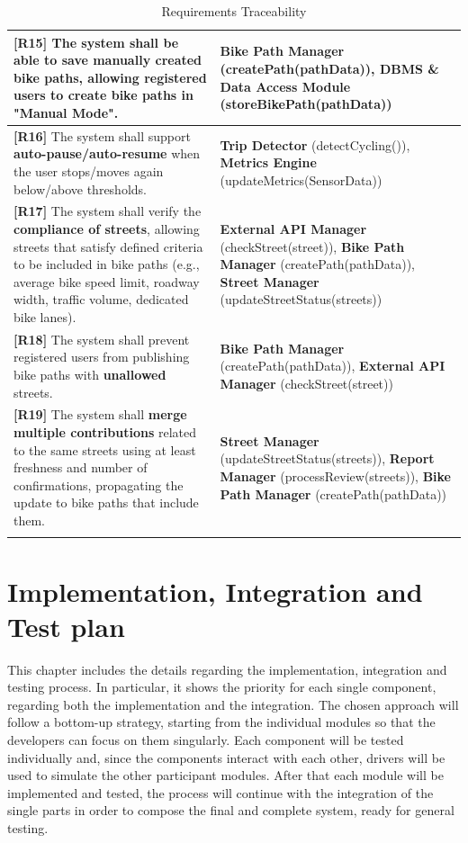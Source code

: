 \documentclass{Configuration_Files/PoliMi3i_thesis}
\begin{document}
\begin{longtable}{|p{}|p{}|}
    \hline
    \textbf{[R15]} The system shall be able to \textbf{save} manually created bike paths, allowing registered users to create bike paths in "Manual Mode". & \textbf{Bike Path Manager} (createPath(pathData)), \textbf{DBMS \& Data Access Module} (storeBikePath(pathData)) \\
    \hline
    \textbf{[R16]} The system shall support \textbf{auto-pause/auto-resume} when the user stops/moves again below/above thresholds. & \textbf{Trip Detector} (detectCycling()), \textbf{Metrics Engine} (updateMetrics(SensorData)) \\
    \hline
    \textbf{[R17]} The system shall verify the \textbf{compliance of streets}, allowing streets that satisfy defined criteria to be included in bike paths (e.g., average bike speed limit, roadway width, traffic volume, dedicated bike lanes). & \textbf{External API Manager} (checkStreet(street)), \textbf{Bike Path Manager} (createPath(pathData)), \textbf{Street Manager} (updateStreetStatus(streets)) \\
    \hline
    \textbf{[R18]} The system shall prevent registered users from publishing bike paths with \textbf{unallowed} streets. & \textbf{Bike Path Manager} (createPath(pathData)), \textbf{External API Manager} (checkStreet(street)) \\
    \hline
    \textbf{[R19]} The system shall \textbf{merge multiple contributions} related to the same streets using at least freshness and number of confirmations, propagating the update to bike paths that include them. & \textbf{Street Manager} (updateStreetStatus(streets)), \textbf{Report Manager} (processReview(streets)), \textbf{Bike Path Manager} (createPath(pathData)) \\
    \hline
    \caption{Requirements Traceability}
    \end{longtable}

\chapter{Implementation, Integration and Test plan}
This chapter includes the details regarding the implementation, integration and testing process. In particular, it shows the priority for each single component, regarding both the implementation and the integration. The chosen approach will follow a bottom-up strategy, starting from the individual modules so that the developers can focus on them singularly. Each component will be tested individually and, since the components interact with each other, drivers will be used to simulate the other participant modules. After that each module will be implemented and tested, the process will continue with the integration of the single parts in order to compose the final and complete system, ready for general testing.
\end{document}
